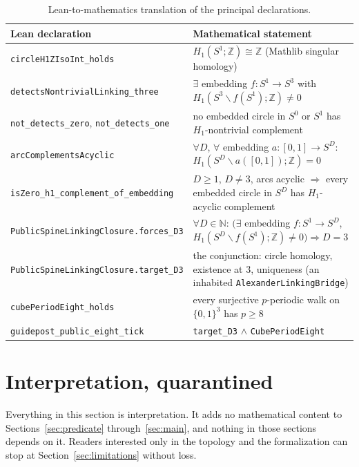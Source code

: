 \documentclass[11pt]{article}
\theoremstyle{definition}
\newcommand{\Z}{\mathbb{Z}}
\newcommand{\N}{\mathbb{N}}
\newcommand{\Sph}[1]{S^{#1}}
\newcommand{\lean}[1]{\texttt{#1}}
\begin{document}
\begin{table}[ht]
\centering
\small
\renewcommand{\arraystretch}{1.45}
\begin{tabular}{@{}p{}p{}@{}}
\toprule
\textbf{Lean declaration} & \textbf{Mathematical statement} \\
\midrule
\lean{circleH1ZIsoInt\_holds} & $H_1(S^1;\Z) \cong \Z$ (Mathlib singular homology) \\
\lean{detectsNontrivialLinking\_three} & $\exists$ embedding $f\colon S^1 \to \Sph{3}$ with $H_1(\Sph{3} \smallsetminus f(S^1);\Z) \neq 0$ \\
\lean{not\_detects\_zero}, \lean{not\_detects\_one} & no embedded circle in $\Sph{0}$ or $\Sph{1}$ has $H_1$-nontrivial complement \\
\lean{arcComplementsAcyclic} & $\forall D$, $\forall$ embedding $a \colon [0,1] \to \Sph{D}$: $H_1(\Sph{D} \smallsetminus a([0,1]);\Z) = 0$ \\
\lean{isZero\_h1\_complement\_of\_embedding} & $D \geq 1$, $D \neq 3$, arcs acyclic $\Rightarrow$ every embedded circle in $\Sph{D}$ has $H_1$-acyclic complement \\
\lean{PublicSpineLinkingClosure.forces\_D3} & $\forall D \in \N$: $\bigl(\exists$ embedding $f\colon S^1 \to \Sph{D}$, $H_1(\Sph{D}\smallsetminus f(S^1);\Z) \neq 0\bigr) \Rightarrow D = 3$ \\
\lean{PublicSpineLinkingClosure.target\_D3} & the conjunction: circle homology, existence at $3$, uniqueness (an inhabited \lean{AlexanderLinkingBridge}) \\
\lean{cubePeriodEight\_holds} & every surjective $p$-periodic walk on $\{0,1\}^3$ has $p \geq 8$ \\
\lean{guidepost\_public\_eight\_tick} & \lean{target\_D3} $\wedge$ \lean{CubePeriodEight} \\
\bottomrule
\end{tabular}
\caption{Lean-to-mathematics translation of the principal declarations.}
\label{tab:translation}
\end{table}

\section{Interpretation, quarantined}
\label{sec:interpretation}

Everything in this section is interpretation. It adds no mathematical content to Sections~\ref{sec:predicate} through~\ref{sec:main}, and nothing in those sections depends on it. Readers interested only in the topology and the formalization can stop at Section~\ref{sec:limitations} without loss.
\end{document}
